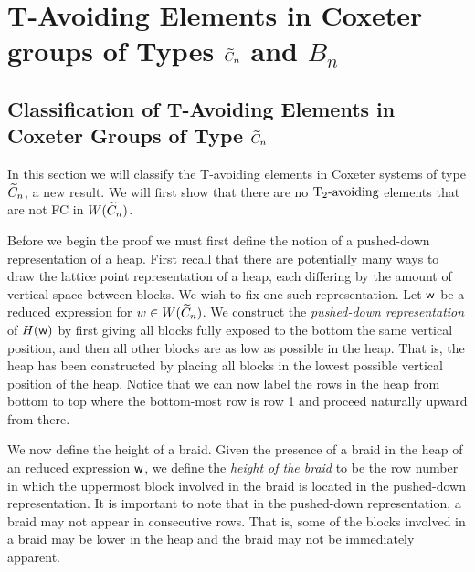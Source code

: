 \chapter{T-Avoiding Elements in Coxeter groups of Types $\widetilde{C}_n$ and $B_n$}\label{chap:Cn}



\section{Classification of T-Avoiding Elements in Coxeter Groups of Type $\widetilde{C}_n$}\label{sec:TAC}

In this section we will classify the T-avoiding elements in Coxeter systems of type $\widetilde{C}_n$, a new result. We will first show that there are no $\operatorname{T_2-\mathrm{avoiding}}$ elements that are not FC in $W(\widetilde{C}_n)$.

Before we begin the proof we must first define the notion of a pushed-down representation of a heap. First recall that there are potentially many ways to draw the lattice point representation of a heap, each differing by the amount of vertical space between blocks. We wish to fix one such representation. Let $\mathsf{w}$ be a reduced expression for $w \in W(\widetilde{C}_n)$. We construct the \emph{pushed-down representation} of $H(\mathsf{w})$ by first giving all blocks fully exposed to the bottom the same vertical position, and then all other blocks are as low as possible in the heap. That is, the heap has been constructed by placing all blocks in the lowest possible vertical position of the heap. Notice that we can now label the rows in the heap from bottom to top where the bottom-most row is row 1 and proceed naturally upward from there. 

We now define the height of a braid. Given the presence of a braid in the heap of an reduced expression $\mathsf{w}$, we define the \emph{height of the braid} to be the row number in which the uppermost block involved in the braid is located in the pushed-down representation. It is important to note that in the pushed-down representation, a braid may not appear in consecutive rows. That is, some of the blocks involved in a braid may be lower in the heap and the braid may not be immediately apparent. 

